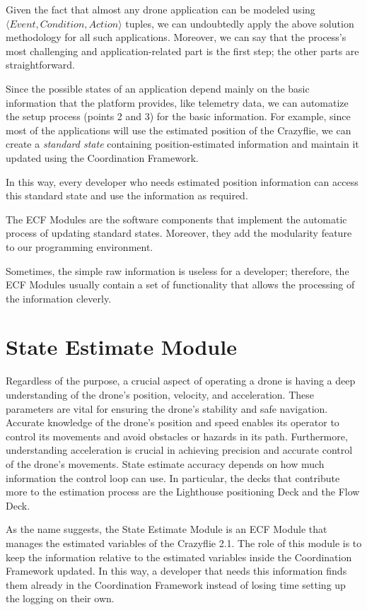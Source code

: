 Given the fact that almost any drone application can be modeled using\\
\( \langle Event, Condition, Action \rangle \) tuples, we can undoubtedly apply the above solution methodology for all such applications.
Moreover, we can say that the process's most challenging and application-related part is the first step; the other parts are straightforward.

Since the possible states of an application depend mainly on the basic information that the platform provides, like telemetry data, we can automatize the setup process (points 2 and 3) for the basic information.
For example, since most of the applications will use the estimated position of the Crazyflie, we can create a \textit{standard state} containing position-estimated information and maintain it updated using the Coordination Framework.

In this way, every developer who needs estimated position information can access this standard state and use the information as required.

The ECF Modules are the software components that implement the automatic process of updating standard states. Moreover, they add the modularity feature to our programming environment.

Sometimes, the simple raw information is useless for a developer; therefore, the ECF Modules usually contain a set of functionality that allows the processing of the information cleverly. 


\section{State Estimate Module}\label{sec:module_state_estimate}
Regardless of the purpose, a crucial aspect of operating a drone is having a deep understanding of the drone's position, velocity, and acceleration. 
These parameters are vital for ensuring the drone's stability and safe navigation. 
Accurate knowledge of the drone's position and speed enables its operator to control its movements and avoid obstacles or hazards in its path. 
Furthermore, understanding acceleration is crucial in achieving precision and accurate control of the drone's movements.
State estimate accuracy depends on how much information the control loop can use. 
In particular, the decks that contribute more to the estimation process are the Lighthouse positioning Deck and the Flow Deck. 

As the name suggests, the State Estimate Module is an ECF Module that manages the estimated variables of the Crazyflie 2.1.
The role of this module is to keep the information relative to the estimated variables inside the Coordination Framework updated.
In this way, a developer that needs this information finds them already in the Coordination Framework instead of losing time setting up the logging on their own.

